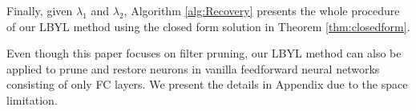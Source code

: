 Finally, given $\lambda_{1}$ and $\lambda_{2}$, Algorithm \ref{alg:Recovery} presents the whole procedure of our LBYL method using the closed form solution in Theorem \ref{thm:closedform}.

Even though this paper focuses on filter pruning, our LBYL method can also be applied to prune and restore neurons in vanilla feedforward neural networks consisting of only FC layers. We present the details in Appendix due to the space limitation.












